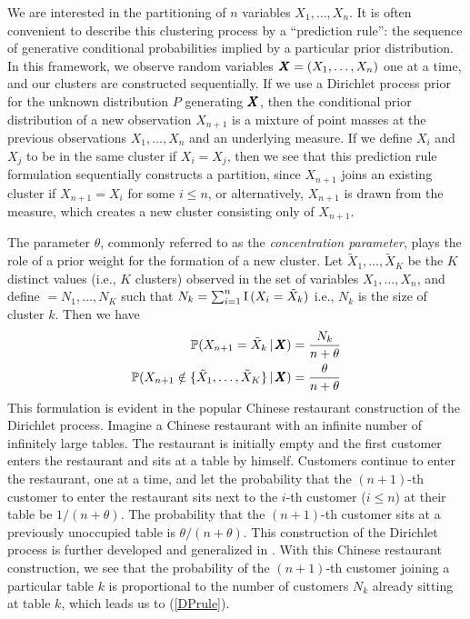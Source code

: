 \documentclass[]{article}
\begin{document}
We are interested in the partitioning of $n$ variables $X_1, \ldots,
X_n$.  It is often convenient to describe this clustering process by a
``prediction rule'': the sequence of generative conditional
probabilities implied by a particular prior distribution.  In this
framework, we observe random variables $\pmb{X} = (X_1, \ldots, X_n)$ one
at a time, and our clusters are constructed sequentially.  If we use a
Dirichlet process prior for the unknown distribution $P$ generating
$\pmb{X}$, then the conditional prior distribution of a new observation
$X_{n + 1}$ is a mixture of point masses at the previous observations
$X_1, \ldots, X_n$ and an underlying measure.  If we define $X_i$ and
$X_j$ to be in the same cluster if $X_i = X_j$, then we see that this
prediction rule formulation sequentially constructs a partition, since
$X_{n + 1}$ joins an existing cluster if $X_{n + 1} = X_i$ for some $i
\leq n$, or alternatively, $X_{n + 1}$ is drawn from the measure,
which creates a new cluster consisting only of $X_{n + 1}$.  

The parameter $\theta$, commonly referred to as the {\it concentration parameter}, plays the role of a prior weight for the formation
of a new cluster.  Let $\tilde{X}_1, \ldots, \tilde{X}_K$ be the $K$
distinct values (i.e., $K$ clusters) observed in the set of variables
$X_1, \ldots, X_n$, and define $=N_1,\ldots, N_K$ such that $N_k =
\sum_{i=1}^n {\rm I}\, (X_i = \tilde{X}_k)$ i.e., $N_k$ is the size of
cluster $k$.  Then we have
\begin{align}
\mathbb{P}(X_{n + 1} = \tilde{X}_k \,|\, \pmb{X}) &= \frac{N_k}{n +
  \theta}  \notag \\
\mathbb{P}(X_{n + 1} \notin \{\tilde{X}_1, \ldots, \tilde{X}_K\} \,|\, \pmb{X}) &=
\frac{\theta}{n + \theta}  \label{DPrule}
\end{align}
This formulation is evident in the popular Chinese restaurant
construction of the Dirichlet process.  Imagine a Chinese restaurant
with an infinite number of infinitely large tables. The restaurant is
initially empty and the first customer enters the restaurant and sits
at a table by himself.  Customers continue to enter the restaurant,
one at a time, and let the probability that the $(n+1)$-th customer to
enter the restaurant sits next to the $i$-th customer ($i \leq n$) at
their table be $1/(n + \theta)$. The probability that the $(n+1)$-th
customer sits at a previously unoccupied table is $\theta/(n +
\theta)$.  This construction of the Dirichlet process is further
developed and generalized in \cite{IshJam03}.  With this Chinese
restaurant construction, we see that the probability of the $(n+1)$-th
customer joining a particular table $k$ is proportional to the number
of customers $N_k$ already sitting at table $k$, which leads us to
(\ref{DPrule}).  
\end{document}
